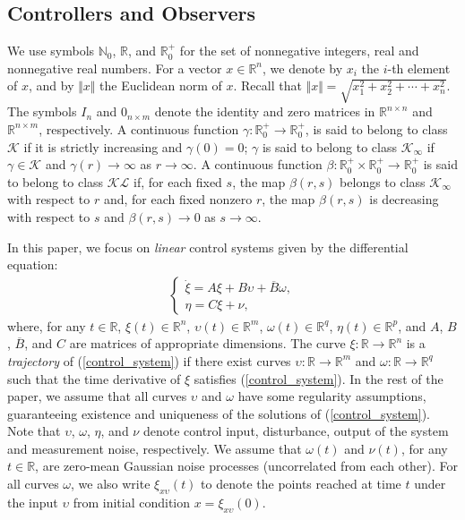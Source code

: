 \documentclass{amsart}
\numberwithin{equation}{section}
\newcommand{\R}{{\mathbb{R}}}
\newcommand{\N}{{\mathbb{N}}}
\begin{document}
\subsection{Controllers and Observers}
We use symbols $\N_0$, $\mathbb{R}$, and $\mathbb{R}^+_0$ for the set of nonnegative integers, real and nonnegative real numbers.
For a vector $x\in\mathbb{R}^{n}$, we denote by $x_{i}$ the {$i$-th} element of $x$, 
and by $\Vert x\Vert$ the Euclidean norm of $x$.
Recall that \mbox{$\Vert x\Vert=\sqrt{x_1^2+x_2^2+\cdots+x_n^2}$}. The symbols $I_n$ and $0_{n\times{m}}$ denote the identity and zero matrices in $\R^{n\times{n}}$ and $\R^{n\times{m}}$, respectively. A continuous function \mbox{$\gamma:\mathbb{R}_{0}^{+}\rightarrow\mathbb{R}_{0}^{+}$}, is said to belong to class $\mathcal{K}$ 
if it is strictly increasing and \mbox{$\gamma(0)=0$}; $\gamma$ is said to belong to class $\mathcal{K}_{\infty}$ if \mbox{$\gamma\in\mathcal{K}$} 
and \mbox{$\gamma(r)\rightarrow\infty$} as $r\rightarrow\infty$. 
A continuous function \mbox{$\beta:\mathbb{R}_{0}^{+}\times\mathbb{R}_{0}^{+}\rightarrow\mathbb{R}_{0}^{+}$} is said to belong to class $\mathcal{KL}$ if, 
for each fixed $s$, the map $\beta(r,s)$ belongs to class $\mathcal{K}_{\infty}$ with respect to $r$
and, for each fixed nonzero $r$, the map $\beta(r,s)$ is decreasing with respect to $s$ and $\beta(r,s)\rightarrow0$ as \mbox{$s\rightarrow\infty$}. 

In this paper, we focus on \textit{linear} control systems given by the differential equation:
\begin{align}
\label{control_system}
\left\{\begin{array}{l}\dot\xi=A\xi+B\upsilon+\overline{B}\omega,\\
\eta=C\xi+\nu,\end{array}\right.
\end{align}
where, for any $t\in\R$, $\xi(t)\in\R^n$, $\upsilon(t)\in\R^m$, $\omega(t)\in\R^q$, $\eta(t)\in\R^p$, and $A$, $B$, $\overline{B}$, and $C$ are matrices of appropriate dimensions. 
The curve $\xi:\R\rightarrow\R^n$ is a \textit{trajectory} of (\ref{control_system}) if there exist curves $\upsilon:\R\rightarrow\R^m$ and $\omega:\R\rightarrow\R^q$ such that the time derivative of $\xi$ satisfies (\ref{control_system}). In the rest of the paper, we assume that all curves $\upsilon$ and $\omega$ have some regularity assumptions, guaranteeing existence and uniqueness of the solutions of (\ref{control_system}). Note that $\upsilon$, $\omega$, $\eta$, and $\nu$ denote control input, disturbance, output of the system and measurement noise, respectively. We assume that $\omega(t)$ and $\nu(t)$, for any $t\in\R$, are zero-mean Gaussian noise processes (uncorrelated from each other). For all curves $\omega$, we also write $\xi_{x\upsilon}(t)$ to denote the points reached at time $t$ under the input $\upsilon$ from initial condition $x=\xi_{x\upsilon}(0)$. 
\end{document}
